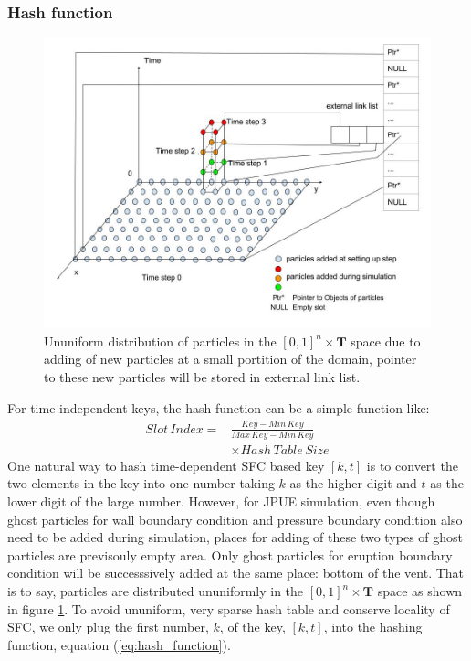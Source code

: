 \documentclass[conference,compsoc]{IEEEtran}
\begin{document}
\subsubsection{Hash function}
\begin{figure}[!t]
\centering
\includegraphics[scale=0.255]{Particle_adding_with_link}
\caption{Ununiform distribution of particles in the $[0,1]^n \times \textbf{T}$ space due to adding of new particles at a small portition of the domain, pointer to these new particles will be stored in external link list.}
\label{fig:Particle_adding_with_link}
\end{figure} 
For time-independent keys, the hash function can be a simple function like:
\begin{equation}
\label{eq:hash_function}
\begin{split}
Slot\,Index= &\frac{Key - Min\,Key}{Max\,Key - Min\,Key} \\
& \times Hash\,Table\,Size 
\end{split}
\end{equation}
One natural way to hash time-dependent SFC based key $[k,t]$ is to convert the two elements in the key into one number taking $k$ as the higher digit and $t$ as the lower digit of the large number. However, for JPUE simulation, even though ghost particles for wall boundary condition and pressure boundary condition also need to be added during simulation, places for adding of these two types of ghost particles are previsouly empty area. Only ghost particles for eruption boundary condition will be successsively added at the same place: bottom of the vent. That is to say, particles are distributed ununiformly in the $[0,1]^n \times \textbf{T}$ space as shown in figure \ref{fig:Particle_adding_with_link}. To avoid ununiform, very sparse hash table and conserve locality of SFC, we only plug the first number, $k$, of the key, $[k,t]$, into the hashing function, equation (\ref{eq:hash_function}). 
\end{document}
